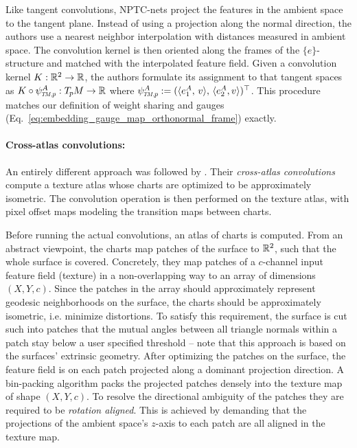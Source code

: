Like tangent convolutions, NPTC-nets project the features in the ambient space to the tangent plane.
Instead of using a projection along the normal direction, the authors use a nearest neighbor interpolation with distances measured in ambient space.
The convolution kernel is then oriented along the frames of the $\{e\}$-structure and matched with the interpolated feature field.
Given a convolution kernel $K: \mathbb{R}^2 \to \mathbb{R}$, the authors formulate its assignment to that tangent spaces as $K \circ \psiTMp^A: \TpM \to \R$ where $\psiTMp^A := (\langle e_1^A,\,v\rangle,\, \langle e_2^A,v\rangle )^\top$.
This procedure matches our definition of weight sharing and gauges (Eq.~\eqref{eq:embedding_gauge_map_orthonormal_frame}) exactly.








\paragraph{Cross-atlas convolutions:}
An entirely different approach was followed by \citet{li2019crossAtlas}.
Their \emph{cross-atlas convolutions} compute a texture atlas whose charts are optimized to be approximately isometric.
The convolution operation is then performed on the texture atlas, with pixel offset maps modeling the transition maps between charts.

Before running the actual convolutions, an atlas of charts is computed.
From an abstract viewpoint, the charts map patches of the surface to $\mathbb{R}^2$, such that the whole surface is covered.
Concretely, they map patches of a $c$-channel input feature field (texture) in a non-overlapping way to an array of dimensions $(X,Y,c)$.
Since the patches in the array should approximately represent geodesic neighborhoods on the surface, the charts should be approximately isometric, i.e. minimize distortions.
To satisfy this requirement, the surface is cut such into patches that the mutual angles between all triangle normals within a patch stay below a user specified threshold -- note that this approach is based on the surfaces' extrinsic geometry.
After optimizing the patches on the surface, the feature field is on each patch projected along a dominant projection direction.
A bin-packing algorithm packs the projected patches densely into the texture map of shape $(X,Y,c)$.
To resolve the directional ambiguity of the patches they are required to be \emph{rotation aligned}.
This is achieved by demanding that the projections of the ambient space's $z$-axis to each patch are all aligned in the texture map.

